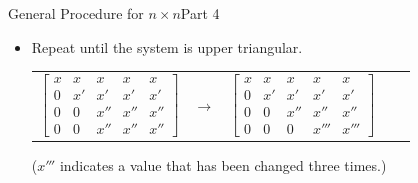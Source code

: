 \documentclass[10pt]{beamer}
\begin{document}
\begin{frame}{General Procedure for $n\times n$}{Part 4}
\begin{itemize}
    \item[6.] Repeat until the system is upper triangular.
\begin{center}
	\renewcommand{\arraystretch}{1.3}
	\footnotesize
	\begin{tabular}{ccccc}
		$\begin{bmatrix} x & x  &     x       & x   & x   \\
						 0 & x' &     x'      & x'  & x'  \\
						 0 & 0  & \boxed{x''} & x'' & x'' \\
						 0 & 0  &     x''     & x'' & x'' \end{bmatrix}$ 
		& $\longrightarrow$ &
		$\begin{bmatrix} x & x  &     x       & x    & x   \\
						 0 & x' &     x'      & x'   & x'  \\
						 0 & 0  & \boxed{x''} & x''  & x'' \\
						 0 & 0  &     0       & x''' & x''' \end{bmatrix}$ 
	\end{tabular}
\end{center}
    ($x'''$ indicates a value that has been changed three times.)
\end{itemize}

\vspace{3mm}

\end{frame}
\end{document}

